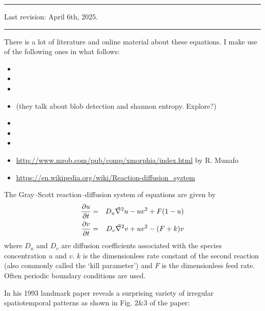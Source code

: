\par\noindent\rule{\textwidth}{0.4pt}

Last revision: April 6th, 2025.

\par\noindent\rule{\textwidth}{0.4pt}


There is a lot of literature and online material about these equations. I make use of the following 
ones in what follows:
\begin{itemize}
\item {}
\item {}
\item {}
\item {} (they talk about blob detection and shannon entropy. Explore?)
\item {}
\item {}
\item {}
\item \url{http://www.mrob.com/pub/comp/xmorphia/index.html} by R. Munafo
\item \url{https://en.wikipedia.org/wiki/Reaction-diffusion_system}
\end{itemize}

The Gray–Scott reaction–diffusion system of equations are given by
\begin{eqnarray}
\frac{\partial u}{\partial t} &=& D_u \vec\nabla^2 u - uv^2 + F(1-u) \nonumber\\
\frac{\partial v}{\partial t} &=& D_v \vec\nabla^2 v + uv^2 - (F+k)v
\end{eqnarray}
where $D_u$ and $D_v$ are diffusion coefficients associated with the species concentration $u$
and $v$. $k$ is the dimensionless rate constant of the second reaction (also commonly called the `kill 
parameter') and $F$ is the dimensionless feed rate.
Often periodic boundary conditions are used. 

In his 1993 landmark paper \textcite{pear93} reveals a surprising variety of 
irregular spatiotemporal patterns as shown in Fig. 2\&3 of the paper:

